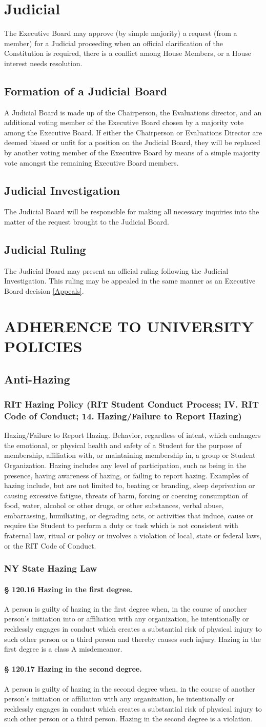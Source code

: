 \documentclass{article}
\newcommand{\article}[1]{\section{#1} \label{#1}}
\newcommand{\asection}[1]{\subsection{#1} \label{#1}}
\newcommand{\asubsection}[1]{\subsubsection{#1} \label{#1}}
\newcommand{\asubsubsection}[1]{\paragraph{#1} \label{#1}}
\begin{document}
\article{Judicial}
The Executive Board may approve (by simple majority) a request (from a member) for a Judicial proceeding when an official clarification of the Constitution is required, there is a conflict among House Members, or a House interest needs resolution.
\asection{Formation of a Judicial Board}
A Judicial Board is made up of the Chairperson, the Evaluations director, and an additional voting member of the Executive Board chosen by a majority vote among the Executive Board.
If either the Chairperson or Evaluations Director are deemed biased or unfit for a position on the Judicial Board, they will be replaced by another voting member of the Executive Board by means of a simple majority vote amongst the remaining Executive Board members.
\asection{Judicial Investigation}
The Judicial Board will be responsible for making all necessary inquiries into the matter of the request brought to the Judicial Board.
\asection{Judicial Ruling}
The Judicial Board may present an official ruling following the Judicial Investigation.
This ruling may be appealed in the same manner as an Executive Board decision \ref{Appeals}.

\article{ADHERENCE TO UNIVERSITY POLICIES}
\asection{Anti-Hazing}
\asubsection{RIT Hazing Policy (RIT Student Conduct Process; IV. RIT Code of Conduct; 14. Hazing/Failure to Report
Hazing)}
Hazing/Failure to Report Hazing.
Behavior, regardless of intent, which endangers the emotional, or physical health and safety of a Student for the purpose of membership, affiliation with, or maintaining membership in, a group or Student Organization. Hazing includes any level of participation, such as being in the presence, having awareness of hazing, or failing to report hazing.
Examples of hazing include, but are not limited to, beating or branding, sleep deprivation or causing excessive fatigue, threats of harm, forcing or coercing consumption of food, water, alcohol or other drugs, or other substances, verbal abuse, embarrassing, humiliating, or degrading acts, or activities that induce, cause or require the Student to perform a duty or task which is not consistent with fraternal law, ritual or policy or involves a violation of local, state or federal laws, or the RIT Code of Conduct.
\asubsection{NY State Hazing Law}
\asubsubsection{§ 120.16 Hazing in the first degree.}
A person is guilty of hazing in the first degree when, in the course of
another person's initiation into or affiliation with any organization, he intentionally or recklessly engages in
conduct which creates a substantial risk of physical injury to such other person or a third person and thereby
causes such injury. Hazing in the first degree is a class A misdemeanor.
\asubsubsection{§ 120.17 Hazing in the second degree.}
A person is guilty of hazing in the second degree when, in the course of another person's initiation or affiliation with any organization, he intentionally or recklessly engages in conduct which creates a substantial risk of physical injury to such other person or a third person.
Hazing in the second degree is a violation.
\end{document}
